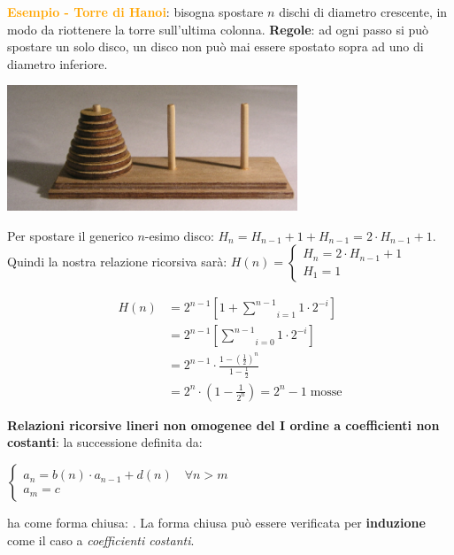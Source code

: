 \begin{boxA}
    \textcolor{orange}{\textbf{Esempio - Torre di Hanoi}}: bisogna spostare $n$ dischi di diametro crescente, in modo da riottenere la torre sull'ultima colonna. \textbf{Regole}: ad ogni passo si può spostare un solo disco, un disco non può mai essere spostato sopra ad uno di diametro inferiore.
    
    \begin{center}
        \includegraphics[width=0.65\textwidth]{img/hanoi}
    \end{center}

    Per spostare il generico $n$-esimo disco: $H_n = H_{n-1} + 1 + H_{n-1} = 2 \cdot H_{n-1} + 1$. Quindi la nostra relazione ricorsiva sarà:
    $H(n) = \begin{cases}
        H_n = 2 \cdot H_{n-1} + 1 \\
        H_1 = 1
    \end{cases}$
    
    \begin{align*}
        H(n) &= 2^{n-1} [1 + \underset{i=1}{\overset{n-1}{\sum}}1 \cdot 2^{-i}] \\
        &= 2^{n-1} [\underset{i=0}{\overset{n-1}{\sum}}1 \cdot 2^{-i}] \\
        &= 2^{n-1} \cdot \frac{1-(\frac{1}{2})^n}{1-\frac{1}{2}} \\
        &= 2^n \cdot (1 - \frac{1}{2^n}) = 2^n - 1 \; \text{mosse}
    \end{align*}
\end{boxA}

\begin{flushleft}
    \textbf{Relazioni ricorsive lineri non omogenee del I ordine a coefficienti non costanti}: la successione definita da:

    {\centering
        $\begin{cases}
            a_n = b(n) \cdot a_{n-1} + d(n) \quad \forall n > m \\
            a_m = c
        \end{cases}$
    \par}
    ha come forma chiusa: . La forma chiusa può essere verificata per \textbf{induzione} come il caso a \textit{coefficienti costanti}.
\end{flushleft}

\newpage